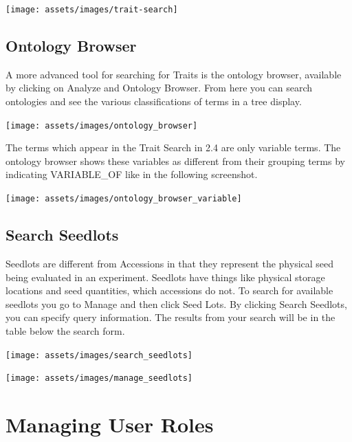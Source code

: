 \documentclass[
  12pt,
]{book}
\begin{document}
\begin{center}\texttt{[image: assets/images/trait-search]} \end{center}

\hypertarget{ontology-browser}{%
\section{Ontology Browser}\label{ontology-browser}}

A more advanced tool for searching for Traits is the ontology browser, available by clicking on Analyze and Ontology Browser. From here you can search ontologies and see the various classifications of terms in a tree display.

\begin{center}\texttt{[image: assets/images/ontology\_browser]} \end{center}

The terms which appear in the Trait Search in 2.4 are only variable terms. The ontology browser shows these variables as different from their grouping terms by indicating VARIABLE\_OF like in the following screenshot.

\begin{center}\texttt{[image: assets/images/ontology\_browser\_variable]} \end{center}

\hypertarget{search-seedlots}{%
\section{Search Seedlots}\label{search-seedlots}}

Seedlots are different from Accessions in that they represent the physical seed being evaluated in an experiment. Seedlots have things like physical storage locations and seed quantities, which accessions do not. To search for available seedlots you go to Manage and then click Seed Lots. By clicking Search Seedlots, you can specify query information. The results from your search will be in the table below the search form.

\begin{center}\texttt{[image: assets/images/search\_seedlots]} \end{center}

\begin{center}\texttt{[image: assets/images/manage\_seedlots]} \end{center}

\hypertarget{managing-user-roles}{%
\chapter{Managing User Roles}\label{managing-user-roles}}
\end{document}
